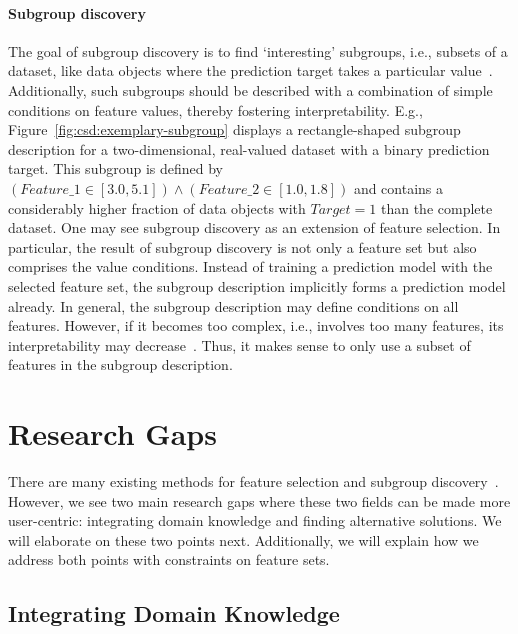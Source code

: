\paragraph{Subgroup discovery}

The goal of subgroup discovery is to find `interesting' subgroups, i.e., subsets of a dataset, like data objects where the prediction target takes a particular value~\cite{atzmueller2015subgroup}.
Additionally, such subgroups should be described with a combination of simple conditions on feature values, thereby fostering interpretability.
E.g., Figure~\ref{fig:csd:exemplary-subgroup} displays a rectangle-shaped subgroup description for a two-dimensional, real-valued dataset with a binary prediction target.
This subgroup is defined by $(\mathit{Feature\_1} \in [3.0, 5.1]) \land (\mathit{Feature\_2} \in [1.0, 1.8])$ and contains a considerably higher fraction of data objects with $\mathit{Target} = 1$ than the complete dataset.
One may see subgroup discovery as an extension of feature selection.
In particular, the result of subgroup discovery is not only a feature set but also comprises the value conditions.
Instead of training a prediction model with the selected feature set, the subgroup description implicitly forms a prediction model already.
In general, the subgroup description may define conditions on all features.
However, if it becomes too complex, i.e., involves too many features, its interpretability may decrease~\cite{meeng2021real}.
Thus, it makes sense to only use a subset of features in the subgroup description.

\section{Research Gaps}
\label{sec:introduction:research-gaps}

There are many existing methods for feature selection and subgroup discovery~\cite{atzmueller2015subgroup, li2017feature}.
However, we see two main research gaps where these two fields can be made more user-centric:
integrating domain knowledge and finding alternative solutions.
We will elaborate on these two points next.
Additionally, we will explain how we address both points with constraints on feature sets.

\subsection{Integrating Domain Knowledge}
\label{sec:introduction:research-gaps:integrating-domain-knowledge}

